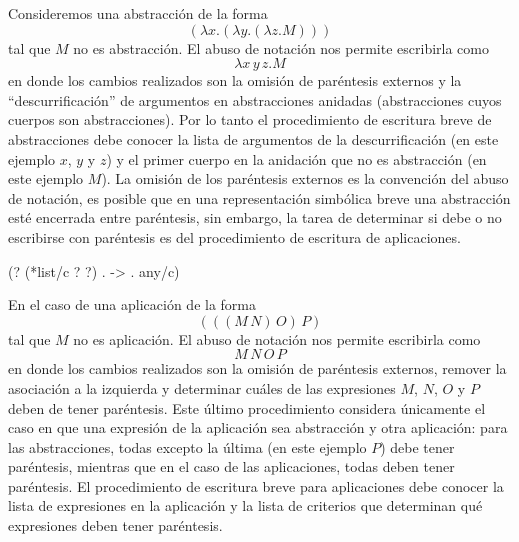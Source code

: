 \documentclass[letterpaper, twoside, openright, 11pt]{book}%
\begin{document}
Consideremos una abstracción de la forma\[ (λx.(λy.(λz.M))) \]tal que \( M \) no es abstracción. El abuso de notación nos permite escribirla como\[ λx\, y\, z.M \]en donde los cambios realizados son la omisión de paréntesis externos y la ``descurrificación'' de argumentos en abstracciones anidadas (abstracciones cuyos cuerpos son abstracciones). Por lo tanto el procedimiento de escritura breve de abstracciones debe conocer la lista de argumentos de la descurrificación (en este ejemplo \( x \), \( y \) y \( z \)) y el primer cuerpo en la anidación que no es abstracción (en este ejemplo \( M \)). La omisión de los paréntesis externos es la convención del abuso de notación, es posible que en una representación simbólica breve una abstracción esté encerrada entre paréntesis, sin embargo, la tarea de determinar si debe o no escribirse con paréntesis es del procedimiento de escritura de aplicaciones.

\nwenddocs{}\endmoddef\nwstartdeflinemarkup{}\nwenddeflinemarkup
(? (*list/c ? ?) 
              . -> . any/c)
\nwendcode{}\nwdocspar

En el caso de una aplicación de la forma\[ (((M\, N)\, O)\, P) \]tal que \( M \) no es aplicación. El abuso de notación nos permite escribirla como\[ M\, N\, O\, P \]en donde los cambios realizados son la omisión de paréntesis externos, remover la asociación a la izquierda y determinar cuáles de las expresiones \( M \), \( N \), \( O \) y \( P \) deben de tener paréntesis. Este último procedimiento considera únicamente el caso en que una expresión de la aplicación sea abstracción y otra aplicación: para las abstracciones, todas excepto la última (en este ejemplo \( P \)) debe tener paréntesis, mientras que en el caso de las aplicaciones, todas deben tener paréntesis. El procedimiento de escritura breve para aplicaciones debe conocer la lista de expresiones en la aplicación y la lista de criterios que determinan qué expresiones deben tener paréntesis.
\end{document}
